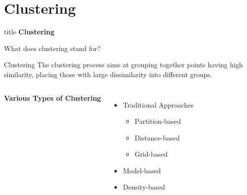\section{Clustering}
\begin{frame}{\hspace{3cm}}
\centering

\vspace{1.5cm}

\begin{beamercolorbox}[sep=20pt,center,rounded=true,shadow=true]{title}
    {\fontsize{20}{24}\selectfont \textbf{Clustering}}
\end{beamercolorbox}

\vspace{0.8cm}


\vfill

\end{frame}
\begin{frame}{What does clustering stand for?}

\begin{block}{Clustering}
The clustering process aims at grouping together points having high similarity, 
placing those with large dissimilarity into different groups.
\end{block}

\vspace{0.3cm}

\begin{columns}

\textbf{Various Types of Clustering}
\begin{itemize}
    \item Traditional Approaches
    \begin{itemize}
    \item Partition-based
    \item Distance-based
    \item Grid-based
     \end{itemize}
    \item Model-based
    \item Density-based
\end{itemize}

\end{columns}

\end{frame}
